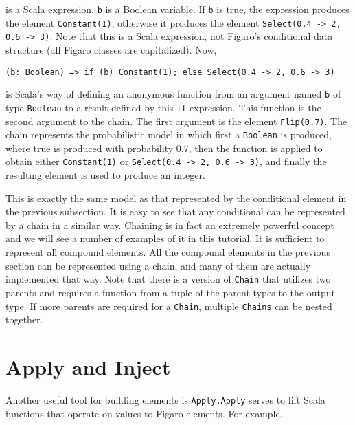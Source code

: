 is a Scala expression. \texttt{b} is a Boolean variable. If \texttt{b} is true, the expression produces the element \texttt{Constant(1)}, otherwise it produces the element \texttt{Select(0.4 -> 2, 0.6 -> 3)}. Note that this is a Scala expression, not Figaro's conditional data structure (all Figaro classes are capitalized). Now,
 
\begin{flushleft}
\texttt{(b: Boolean) =>
\newline \tab if (b) Constant(1); else Select(0.4 -> 2, 0.6 -> 3)}
\end{flushleft}

is Scala's way of defining an anonymous function from an argument named \texttt{b} of type \texttt{Boolean} to a result defined by this \texttt{if} expression. This function is the second argument to the chain. The first argument is the element \texttt{Flip(0.7)}. The chain represents the probabilistic model in which first a \texttt{Boolean} is produced, where true is produced with probability 0.7, then the function is applied to obtain either \texttt{Constant(1)} or \texttt{Select(0.4 -> 2, 0.6 -> 3)}, and finally the resulting element is used to produce an integer.

This is exactly the same model as that represented by the conditional element in the previous subsection. It is easy to see that any conditional can be represented by a chain in a similar way. Chaining is in fact an extremely powerful concept and we will see a number of examples of it in this tutorial. It is sufficient to represent all compound elements. All the compound elements in the previous section can be
represented using a chain, and many of them are actually implemented that way. Note that there is a version of \texttt{Chain} that utilizes two parents and requires a function from a tuple of the parent types to the output type. If more parents are required for a \texttt{Chain}, multiple \texttt{Chains} can be nested together.

\section{Apply and Inject}

Another useful tool for building elements is \texttt{Apply.Apply} serves to lift Scala functions that operate on values to Figaro elements. For example,

